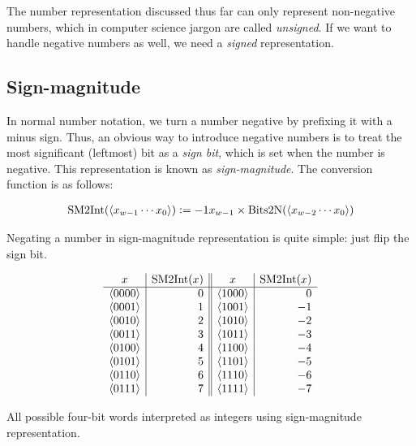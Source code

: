 The number representation discussed thus far can only represent
non-negative numbers, which in computer science jargon are called
\emph{unsigned}.  If we want to handle negative numbers as well, we
need a \emph{signed} representation.

\subsection{Sign-magnitude}
\label{sec:sign-magnitude}

In normal number notation, we turn a number negative by prefixing it
with a minus sign.  Thus, an obvious way to introduce negative numbers
is to treat the most significant (leftmost) bit as a \emph{sign bit},
which is set when the number is negative.  This representation is
known as \emph{sign-magnitude}.  The conversion function is as
follows:

\begin{definition}
\begin{align*}
  \mathrm{SM2Int}(\langle x_{w-1}\cdots x_{0} \rangle) \vcentcolon= -1x_{w-1} \times \mathrm{Bits2N}(\langle x_{w-2}\cdots x_{0} \rangle)
\end{align*}
\label{def:sm2int}
\end{definition}

Negating a number in sign-magnitude representation is quite simple:
just flip the sign bit.

\begin{table}
  \centering
  \[
  \begin{array}{c|r||c|r}
    x & \mathrm{SM2Int}(x) & x & \mathrm{SM2Int}(x) \\\hline
    \langle 0000 \rangle & 0 & \langle 1000 \rangle & 0 \\
    \langle 0001 \rangle & 1 & \langle 1001 \rangle & -1 \\
    \langle 0010 \rangle & 2 & \langle 1010 \rangle & -2 \\
    \langle 0011 \rangle & 3 & \langle 1011 \rangle & -3 \\
    \langle 0100 \rangle & 4 & \langle 1100 \rangle & -4 \\
    \langle 0101 \rangle & 5 & \langle 1101 \rangle & -5 \\
    \langle 0110 \rangle & 6 & \langle 1110 \rangle & -6 \\
    \langle 0111 \rangle & 7 & \langle 1111 \rangle & -7 \\
  \end{array}
  \]
  \caption{All possible four-bit words interpreted as integers using
    sign-magnitude representation.}
  \label{tab:sign-mag}
\end{table}

